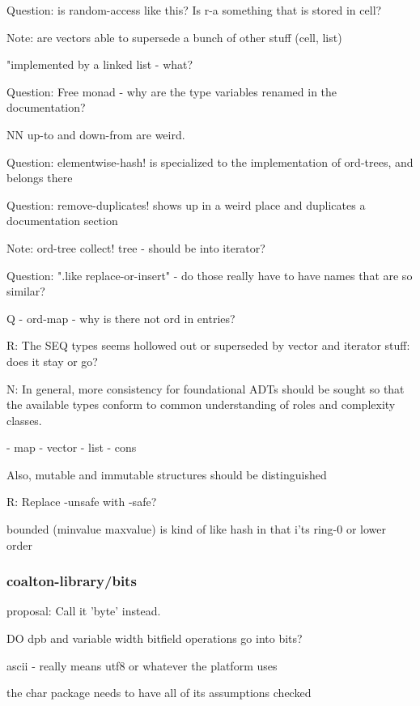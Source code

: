 \documentclass[12pt]{article}
\begin{document}
Question: is random-access like this? Is r-a something that is stored in cell?

Note: are vectors able to supersede a bunch of other stuff (cell, list)

"implemented by a linked list - what?

Question: Free monad - why are the type variables renamed in the documentation?

NN up-to and down-from are weird.

Question: elementwise-hash! is specialized to the implementation of ord-trees, and belongs there

Question: remove-duplicates! shows up in a weird place and duplicates a documentation section

Note: ord-tree collect! tree - should be into iterator?

Question: ".like replace-or-insert" - do those really have to have names that are so similar?

Q - ord-map - why is there not ord in entries?

R: The SEQ types seems hollowed out or superseded by vector and iterator stuff: does it stay or go?

N: In general, more consistency for foundational ADTs should be sought so that the available types conform to common understanding of roles and complexity classes.

  - map
  - vector
  - list
  - cons

Also, mutable and immutable structures should be distinguished

R: Replace -unsafe with -safe?

bounded (minvalue maxvalue) is kind of like hash in that i'ts ring-0 or lower order

\subsubsection{coalton-library/bits}

proposal: Call it 'byte' instead.

DO dpb and variable width bitfield operations go into bits?

ascii - really means utf8 or whatever the platform uses

the char package needs to have all of its assumptions checked
\end{document}
